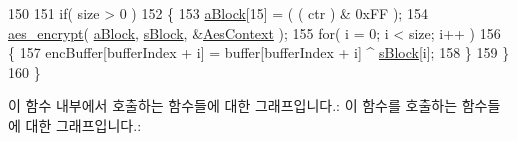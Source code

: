 \begin{DoxyCode}
150 
151     \textcolor{keywordflow}{if}( size > 0 )
152     \{
153         \mbox{\hyperlink{_lo_ra_mac_crypto_8c_abd9ef98e1c4826c3eae0aeb76c0b7629}{aBlock}}[15] = ( ( ctr ) & 0xFF );
154         \mbox{\hyperlink{aes_8c_ac88fd4e9cb53f78713a8fce1a6fcffc0}{aes\_encrypt}}( \mbox{\hyperlink{_lo_ra_mac_crypto_8c_abd9ef98e1c4826c3eae0aeb76c0b7629}{aBlock}}, \mbox{\hyperlink{_lo_ra_mac_crypto_8c_af3c68fef5488da81bfffbc456373746b}{sBlock}}, &\mbox{\hyperlink{_lo_ra_mac_crypto_8c_a3bd634efd0dfb2a63534d8091949e208}{AesContext}} );
155         \textcolor{keywordflow}{for}( i = 0; i < size; i++ )
156         \{
157             encBuffer[bufferIndex + i] = buffer[bufferIndex + i] ^ \mbox{\hyperlink{_lo_ra_mac_crypto_8c_af3c68fef5488da81bfffbc456373746b}{sBlock}}[i];
158         \}
159     \}
160 \}
\end{DoxyCode}
이 함수 내부에서 호출하는 함수들에 대한 그래프입니다.\+:
이 함수를 호출하는 함수들에 대한 그래프입니다.\+:
